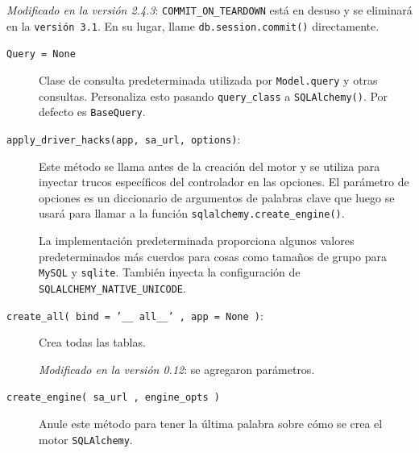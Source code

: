 \documentclass[11pt,letterpaper,notumble]{leaflet}
\begin{document}
{\begin{minipage}{1.6\linewidth}
    		    \textit{Modificado en la versión 2.4.3}: \texttt{COMMIT\_ON\_TEARDOWN} está en desuso y se eliminará en la \texttt{versión 3.1}. En su lugar, llame \texttt{db.session.commit()} directamente.
    		    
                \begin{description}
                	
                	\item[\texttt{Query = None}]

                	Clase de consulta predeterminada utilizada por \texttt{Model.query} y otras consultas. Personaliza esto pasando \texttt{query\_class} a \texttt{SQLAlchemy()}. Por defecto es \texttt{BaseQuery}.
                	
                	
                	\item[\texttt{apply\_driver\_hacks(app, sa\_url, options)}:]
                	
                	Este método se llama antes de la creación del motor y se utiliza para inyectar trucos específicos del controlador en las opciones. El parámetro de opciones es un diccionario de argumentos de palabras clave que luego se usará para llamar a la función \texttt{sqlalchemy.create\_engine()}.
                	
                	La implementación predeterminada proporciona algunos valores predeterminados más cuerdos para cosas como tamaños de grupo para \texttt{MySQL} y \texttt{sqlite}. También inyecta la configuración de \texttt{SQLALCHEMY\_NATIVE\_UNICODE}.
                	
                	\item[\texttt{create\_all( bind = '\_\_ all\_\_' , app = None )}:]
                	Crea todas las tablas.
                		
                	\textit{Modificado en la versión 0.12}: se agregaron parámetros.
                	\item[\texttt{create\_engine( sa\_url , engine\_opts )}] 
                	Anule este método para tener la última palabra sobre cómo se crea el motor \texttt{SQLAlchemy}.
                	
                \end{description}
           
        \end{minipage}
    
    }
    
\end{document}
